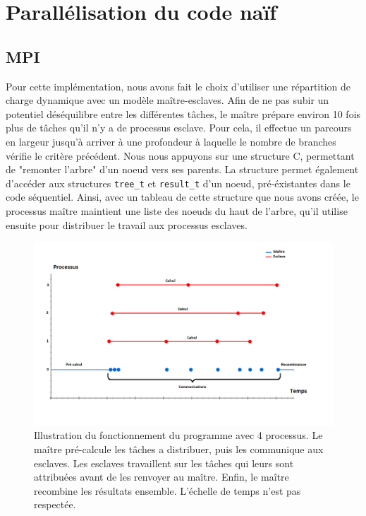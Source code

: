 \documentclass[12pt]{article}
\begin{document}


\section{Parallélisation du code naïf}
    \subsection{MPI}
    Pour cette implémentation, nous avons fait le choix d'utiliser une 
    répartition de charge dynamique avec un modèle maître-esclaves.
    Afin de ne pas subir un potentiel déséquilibre entre les différentes
    tâches, le maître prépare environ 10 fois plus de tâches qu'il n'y a
    de processus esclave. Pour cela, il effectue un parcours en largeur
    jusqu'à arriver à une profondeur à laquelle le nombre de branches vérifie le
    critère précédent. Nous nous appuyons sur une structure C, permettant de
    "remonter l'arbre" d'un noeud vers ses parents. La structure permet
    également d'accéder aux structures \texttt{tree\_t} et \texttt{result\_t}
    d'un noeud, pré-éxistantes dans le code séquentiel.
    Ainsi, avec un tableau de cette structure que nous avons créée, le 
    processus maître maintient une liste des noeuds du haut de l'arbre,
    qu'il utilise ensuite pour distribuer le travail aux processus esclaves.\\
    \begin{figure}[t] \begin{center}
        \includegraphics[scale=0.33]{figures/time}
        \caption{\label{fig:time}Illustration du fonctionnement du programme
        avec 4 processus. Le maître pré-calcule les tâches a distribuer,
        puis les communique aux esclaves. Les esclaves travaillent sur les
        tâches qui leurs sont attribuées avant de les renvoyer au maître.
        Enfin, le maître recombine les résultats ensemble. L'échelle de temps 
        n'est pas respectée.}
    \end{center} \end{figure}
\end{document}
